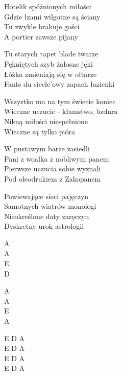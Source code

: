 \begin{text}
    Hotelik spóźnionych miłości\\
    Gdzie łzami wilgotne są ściany\\
    Tu zwykle brakuje gości\\
    A portier zawsze pijany

    Tu starych tapet blade twarze\\
    Pękniętych szyb żałosne jęki\\
    Łóżka zmieniają się w ołtarze\\
    Fants du siecle’owy zapach łazienki

    Wszystko ma na tym świecie koniec\\
    Wieczne uczucie - kłamstwo, bzdura\\
    Nikną miłości niespełnione\\
    Wieczne są tylko pióra

    W pustawym barze zasiedli\\
    Pani z woalka z nobliwym panem\\
    Pierwsze uczucia sobie wyznali\\
    Pod oleodrukiem z Zakopanem

    Powiewające sieci pajęczyn\\
    Samotnych wiatrów monologi\\
    Nieokreślone daty zaręczyn\\
    Dyskretny urok astrologii
\end{text}
\begin{chord}
    A\\
    A\\
    E\\
    D

    A\\
    A\\
    E\\
    A

    E D A\\
    E D A\\
    E D A\\
    E D A
\end{chord}